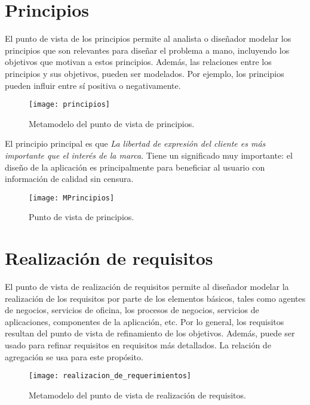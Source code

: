 \section{Principios}


El punto de vista de los principios permite al analista o diseñador modelar los principios que son relevantes para diseñar el problema a mano, incluyendo los objetivos que motivan a estos principios. Además, las relaciones entre los principios y sus objetivos, pueden ser modelados. Por ejemplo, los principios pueden influir entre sí positiva o negativamente.

\begin{figure}[H]
\centering
\texttt{[image: principios]}
\caption{Metamodelo del punto de vista de principios.}
\end{figure}

El principio principal es que \textit{La libertad de expresión del cliente es más importante que el interés de la marca}. Tiene un significado muy importante: el diseño de la aplicación es principalmente para beneficiar al usuario con información de calidad sin censura.

\begin{figure}[h]
\centering
\texttt{[image: MPrincipios]}
\caption{Punto de vista de principios.}
\end{figure}


\section{Realización de requisitos}

El punto de vista de realización de requisitos permite al diseñador modelar la realización de los requisitos por parte de los elementos básicos, tales como agentes de negocios, servicios de oficina, los procesos de negocios, servicios de aplicaciones, componentes de la aplicación, etc. Por lo general, los requisitos resultan del punto de vista de refinamiento de los objetivos. Además, puede ser usado para refinar requisitos en requisitos más detallados. La relación de agregación se usa para este propósito.

\begin{figure}[h]
\centering
\texttt{[image: realizacion\_de\_requerimientos]}
\caption{Metamodelo del punto de vista de realización de requisitos.}
\end{figure}

